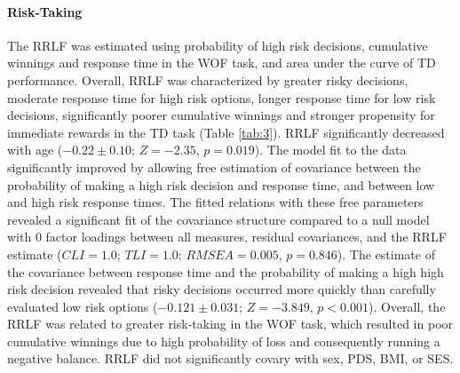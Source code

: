 \documentclass{article}%
\begin{document}
\paragraph*{Risk-Taking} The RRLF was estimated using probability of high risk decisions, cumulative winnings and response time in the WOF task, and area under the curve of TD performance. Overall, RRLF was characterized by greater risky decisions, moderate response time for high risk options, longer response time for low risk decisions, significantly poorer cumulative winnings and stronger propensity for immediate rewards in the TD task (Table \ref{tab:3}). RRLF significantly decreased with age ($-0.22\pm0.10$; $Z=-2.35$, $p = 0.019$). The model fit to the data significantly improved by allowing free estimation of covariance between the probability of making a high risk decision and response time, and between low and high risk response times. The fitted relations with these free parameters revealed a significant fit of the covariance structure compared to a null model with 0 factor loadings between all measures, residual covariances, and the RRLF estimate ($CLI = 1.0$; $TLI = 1.0$; $RMSEA = 0.005$, $p = 0.846$). The estimate of the covariance between response time and the probability of making a high high risk decision revealed that risky decisions occurred more quickly than carefully evaluated low risk options ($-0.121\pm0.031$; $Z=-3.849$, $p<0.001$). Overall, the RRLF was related to greater risk-taking in the WOF task, which resulted in poor cumulative winnings due to high probability of loss and consequently running a negative balance. RRLF did not significantly covary with sex, PDS, BMI, or SES.
\end{document}
